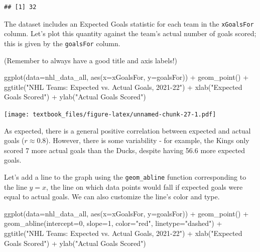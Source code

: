 \documentclass[
  11pt,
]{book}
\newenvironment{Shaded}{\begin{snugshade}}{\end{snugshade}}
\newcommand{\AttributeTok}[1]{\textcolor[rgb]{0.77,0.63,0.00}{#1}}
\newcommand{\DecValTok}[1]{\textcolor[rgb]{0.00,0.00,0.81}{#1}}
\newcommand{\FunctionTok}[1]{\textcolor[rgb]{0.00,0.00,0.00}{#1}}
\newcommand{\NormalTok}[1]{#1}
\newcommand{\SpecialCharTok}[1]{\textcolor[rgb]{0.00,0.00,0.00}{#1}}
\newcommand{\StringTok}[1]{\textcolor[rgb]{0.31,0.60,0.02}{#1}}
\theoremstyle{definition}
\theoremstyle{definition}
\theoremstyle{definition}
\theoremstyle{definition}
\theoremstyle{remark}
\begin{document}
\begin{verbatim}
## [1] 32
\end{verbatim}

The dataset includes an Expected Goals statistic for each team in the \texttt{xGoalsFor} column. Let's plot this quantity against the team's actual number of goals scored; this is given by the \texttt{goalsFor} column.

(Remember to always have a good title and axis labels!)

\begin{Shaded}
\begin{Highlighting}[]
\FunctionTok{ggplot}\NormalTok{(}\AttributeTok{data=}\NormalTok{nhl\_data\_all, }\FunctionTok{aes}\NormalTok{(}\AttributeTok{x=}\NormalTok{xGoalsFor, }\AttributeTok{y=}\NormalTok{goalsFor)) }\SpecialCharTok{+} 
  \FunctionTok{geom\_point}\NormalTok{() }\SpecialCharTok{+} 
  \FunctionTok{ggtitle}\NormalTok{(}\StringTok{"NHL Teams: Expected vs. Actual Goals, 2021{-}22"}\NormalTok{) }\SpecialCharTok{+}
  \FunctionTok{xlab}\NormalTok{(}\StringTok{"Expected Goals Scored"}\NormalTok{) }\SpecialCharTok{+}
  \FunctionTok{ylab}\NormalTok{(}\StringTok{"Actual Goals Scored"}\NormalTok{) }
\end{Highlighting}
\end{Shaded}

\texttt{[image: textbook\_files/figure-latex/unnamed-chunk-27-1.pdf]}

As expected, there is a general positive correlation between expected and actual goals (\(r \approx 0.8\)). However, there is some variability - for example, the Kings only scored 7 more actual goals than the Ducks, despite having 56.6 more expected goals.

Let's add a line to the graph using the \texttt{geom\_abline} function corresponding to the line \(y=x\), the line on which data points would fall if expected goals were equal to actual goals. We can also customize the line's color and type.

\begin{Shaded}
\begin{Highlighting}[]
\FunctionTok{ggplot}\NormalTok{(}\AttributeTok{data=}\NormalTok{nhl\_data\_all, }\FunctionTok{aes}\NormalTok{(}\AttributeTok{x=}\NormalTok{xGoalsFor, }\AttributeTok{y=}\NormalTok{goalsFor)) }\SpecialCharTok{+} 
  \FunctionTok{geom\_point}\NormalTok{() }\SpecialCharTok{+} 
  \FunctionTok{geom\_abline}\NormalTok{(}\AttributeTok{intercept=}\DecValTok{0}\NormalTok{, }\AttributeTok{slope=}\DecValTok{1}\NormalTok{, }\AttributeTok{color=}\StringTok{"red"}\NormalTok{, }\AttributeTok{linetype=}\StringTok{"dashed"}\NormalTok{) }\SpecialCharTok{+} 
  \FunctionTok{ggtitle}\NormalTok{(}\StringTok{"NHL Teams: Expected vs. Actual Goals, 2021{-}22"}\NormalTok{) }\SpecialCharTok{+}
  \FunctionTok{xlab}\NormalTok{(}\StringTok{"Expected Goals Scored"}\NormalTok{) }\SpecialCharTok{+}
  \FunctionTok{ylab}\NormalTok{(}\StringTok{"Actual Goals Scored"}\NormalTok{) }
\end{Highlighting}
\end{Shaded}
\end{document}
